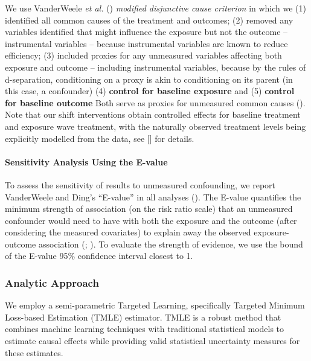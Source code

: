 \documentclass[
  single column]{article}
\let\oldparagraph\paragraph
\renewcommand{\paragraph}[1]{\oldparagraph{#1}\mbox{}}
\begin{document}
We use VanderWeele \emph{et al.} ()
\emph{modified disjunctive cause criterion} in which we (1) identified
all common causes of the treatment and outcomes; (2) removed any
variables identified that might influence the exposure but not the
outcome -- instrumental variables -- because instrumental variables are
known to reduce efficiency; (3) included proxies for any unmeasured
variables affecting both exposure and outcome -- including instrumental
variables, because by the rules of d-separation, conditioning on a proxy
is akin to conditioning on its parent (in this case, a confounder) (4)
\textbf{control for baseline exposure} and (5) \textbf{control for
baseline outcome} Both serve as proxies for unmeasured common causes
(). Note
that our shift interventions obtain controlled effects for baseline
treatment and exposure wave treatment, with the naturally observed
treatment levels being explicitly modelled from the data, see {[}{]} for
details.

\paragraph{Sensitivity Analysis Using the
E-value}\label{sensitivity-analysis-using-the-e-value}

To assess the sensitivity of results to unmeasured confounding, we
report VanderWeele and Ding's ``E-value'' in all analyses
(). The E-value
quantifies the minimum strength of association (on the risk ratio scale)
that an unmeasured confounder would need to have with both the exposure
and the outcome (after considering the measured covariates) to explain
away the observed exposure-outcome association
(;
). To
evaluate the strength of evidence, we use the bound of the E-value 95\%
confidence interval closest to 1.

\subsubsection{Analytic Approach}\label{analytic-approach}

We employ a semi-parametric Targeted Learning, specifically Targeted
Minimum Loss-based Estimation (TMLE) estimator. TMLE is a robust method
that combines machine learning techniques with traditional statistical
models to estimate causal effects while providing valid statistical
uncertainty measures for these estimates.
\end{document}
